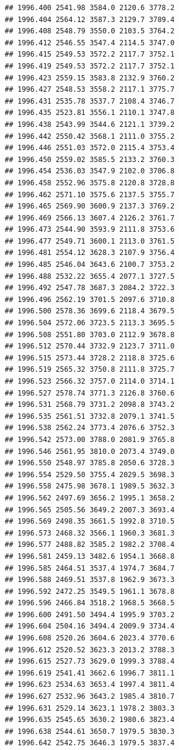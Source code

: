 \documentclass[
]{book}
\begin{document}
\begin{verbatim}
## 1996.400 2541.98 3584.0 2120.6 3778.2
## 1996.404 2564.12 3587.3 2129.7 3789.4
## 1996.408 2548.79 3550.0 2103.5 3764.2
## 1996.412 2546.55 3547.4 2114.5 3747.0
## 1996.415 2549.53 3572.2 2117.7 3752.1
## 1996.419 2549.53 3572.2 2117.7 3752.1
## 1996.423 2559.15 3583.8 2132.9 3760.2
## 1996.427 2548.53 3558.2 2117.1 3775.7
## 1996.431 2535.78 3537.7 2108.4 3746.7
## 1996.435 2523.81 3556.1 2110.1 3747.8
## 1996.438 2543.99 3544.6 2121.1 3739.2
## 1996.442 2550.42 3568.1 2111.0 3755.2
## 1996.446 2551.03 3572.0 2115.4 3753.4
## 1996.450 2559.02 3585.5 2133.2 3760.3
## 1996.454 2536.03 3547.9 2102.0 3706.8
## 1996.458 2552.96 3575.8 2120.8 3728.8
## 1996.462 2571.10 3575.6 2137.5 3755.7
## 1996.465 2569.90 3600.9 2137.3 3769.2
## 1996.469 2566.13 3607.4 2126.2 3761.7
## 1996.473 2544.90 3593.9 2111.8 3753.6
## 1996.477 2549.71 3600.1 2113.0 3761.5
## 1996.481 2554.12 3628.3 2107.9 3756.4
## 1996.485 2546.04 3643.6 2100.7 3753.2
## 1996.488 2532.22 3655.4 2077.1 3727.5
## 1996.492 2547.78 3687.3 2084.2 3722.3
## 1996.496 2562.19 3701.5 2097.6 3710.8
## 1996.500 2578.36 3699.6 2118.4 3679.5
## 1996.504 2572.06 3723.5 2113.3 3695.5
## 1996.508 2551.80 3703.0 2112.9 3678.8
## 1996.512 2570.44 3732.9 2123.7 3711.0
## 1996.515 2573.44 3728.2 2118.8 3725.6
## 1996.519 2565.32 3750.8 2111.8 3725.7
## 1996.523 2566.32 3757.0 2114.0 3714.1
## 1996.527 2578.74 3771.3 2126.8 3760.6
## 1996.531 2568.79 3731.2 2098.8 3743.2
## 1996.535 2561.51 3732.8 2079.1 3741.5
## 1996.538 2562.24 3773.4 2076.6 3752.3
## 1996.542 2573.00 3788.0 2081.9 3765.8
## 1996.546 2561.95 3810.0 2073.4 3749.0
## 1996.550 2548.97 3785.8 2050.6 3728.3
## 1996.554 2529.50 3755.4 2029.5 3698.3
## 1996.558 2475.98 3678.1 1989.5 3632.3
## 1996.562 2497.69 3656.2 1995.1 3658.2
## 1996.565 2505.56 3649.2 2007.3 3693.4
## 1996.569 2498.35 3661.5 1992.8 3710.5
## 1996.573 2468.32 3566.1 1960.3 3681.3
## 1996.577 2488.82 3585.2 1982.2 3708.4
## 1996.581 2459.13 3482.6 1954.1 3668.8
## 1996.585 2464.51 3537.4 1974.7 3684.7
## 1996.588 2469.51 3537.8 1962.9 3673.3
## 1996.592 2472.25 3549.5 1961.1 3678.8
## 1996.596 2466.84 3518.2 1968.5 3668.5
## 1996.600 2491.50 3494.4 1995.9 3703.2
## 1996.604 2504.16 3494.4 2009.9 3734.4
## 1996.608 2520.26 3604.6 2023.4 3770.6
## 1996.612 2520.52 3623.3 2013.2 3788.3
## 1996.615 2527.73 3629.0 1999.3 3788.4
## 1996.619 2541.41 3662.6 1996.7 3811.1
## 1996.623 2534.63 3653.4 1997.4 3811.4
## 1996.627 2532.96 3643.2 1985.4 3810.7
## 1996.631 2529.14 3623.1 1978.2 3803.3
## 1996.635 2545.65 3630.2 1980.6 3823.4
## 1996.638 2544.61 3650.7 1979.5 3830.3
## 1996.642 2542.75 3646.3 1979.5 3837.4

\end{verbatim}
\end{document}
